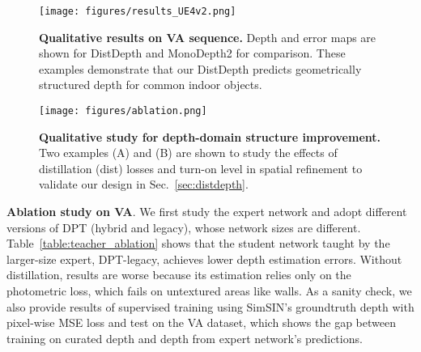 \documentclass[10pt,twocolumn,letterpaper]{article}
\begin{document}
\begin{figure}[bt!]
    \centering
    \texttt{[image: figures/results\_UE4v2.png]}
    \vspace{-1pt}
    \caption{\textbf{Qualitative results on VA sequence.} Depth and error maps are shown for DistDepth and MonoDepth2 for comparison. These examples demonstrate that our DistDepth predicts geometrically structured depth for common indoor objects.}
    \vspace{-15pt}
    \label{results_ue4}
\end{figure}

\begin{figure}[bt!]
    \centering
    \texttt{[image: figures/ablation.png]}
    \vspace{-5pt}
    \caption{\textbf{Qualitative study for depth-domain structure improvement.} Two examples (A) and (B) are shown to study the effects of distillation (dist) losses and turn-on level  in spatial refinement to validate our design in Sec.~\ref{sec:distdepth}.}
    \vspace{-7pt}
    \label{ablation}
\end{figure}

\textbf{Ablation study on VA}. We first study the expert network and adopt different versions of DPT (hybrid and legacy), whose network sizes are different. Table~\ref{table:teacher_ablation} shows that the student network taught by the larger-size expert, DPT-legacy, achieves lower depth estimation errors. Without distillation, results are worse because its estimation relies only on the photometric loss, which fails on untextured areas like walls. As a sanity check, we also provide results of supervised training using SimSIN's groundtruth depth with pixel-wise MSE loss and test on the VA dataset, which shows the gap between training on curated depth and depth from expert network's predictions.
\end{document}
